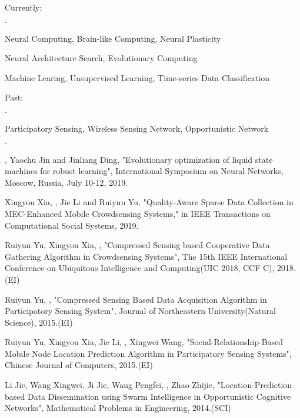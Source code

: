 \documentclass{joel_cv}
\begin{document}
\begin{cvHeader}
\end{cvHeader}


%
%

Currently:
\begin{sectionItemize}{$\cdot$}
	\item Neural Computing, Brain-like Computing, Neural Plasticity
    \item Neural Architecture Search, Evolutionary Computing
    \item Machine Learing, Unsupervised Learning, Time-series Data Classification
\end{sectionItemize}
Past:
\begin{sectionItemize}{$\cdot$}
	\item Participatory Sensing, Wireless Sensing Network, Opportunistic Network
\end{sectionItemize}

%
%

\begin{sectionItemize}{$\cdot$}
    \item {}, Yaochu Jin and Jinliang Ding, "Evolutionary optimization of liquid state machines for robust learning", International Symposium on Neural Networks, Moscow, Russia, July 10-12, 2019.
    \item Xingyou Xia, , Jie Li and Ruiyun Yu, "Quality-Aware Sparse Data Collection in MEC-Enhanced Mobile Crowdsensing Systems," in IEEE Transactions on Computational Social Systems, 2019.
    \item Ruiyun Yu, Xingyou Xia, , "Compressed Sensing based Cooperative Data Gathering Algorithm in Crowdsensing Systems", The 15th IEEE International Conference on Ubiquitous Intelligence and Computing(UIC 2018, CCF C), 2018.(EI)
	\item Ruiyun Yu, , "Compressed Sensing Based Data Acquisition Algorithm in Participatory Sensing System", Journal of Northeastern University(Natural Science), 2015.(EI)
	\item Ruiyun Yu, Xingyou Xia, Jie Li, , Xingwei Wang, "Social-Relationship-Based Mobile Node Location Prediction Algorithm in Participatory Sensing Systems", Chinese Journal of Computers, 2015.(EI)
    \item Li Jie, Wang Xingwei, Ji Jie, Wang Pengfei, , Zhao Zhijie, "Location-Prediction based Data Dissemination using Swarm Intelligence in Opportunistic Cognitive Networks", Mathematical Problems in Engineering, 2014.(SCI)
\end{sectionItemize}
\end{document}
